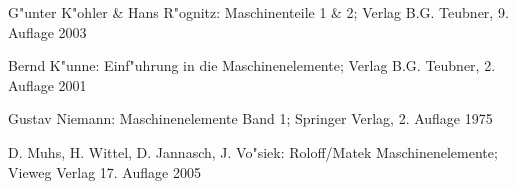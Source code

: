 \begin{thebibliography}{99}



G"unter K"ohler \& Hans R"ognitz: Maschinenteile 1 \& 2;
Verlag B.G. Teubner, 9. Auflage 2003


Bernd K"unne: Einf"uhrung in die Maschinenelemente; 
Verlag B.G. Teubner, 2. Auflage 2001

Gustav Niemann: Maschinenelemente Band 1; Springer Verlag, 2. Auflage 1975

D. Muhs, H. Wittel, D. Jannasch, J. Vo"siek: Roloff/Matek Maschinenelemente;
Vieweg Verlag 17. Auflage 2005

\end{thebibliography} 

